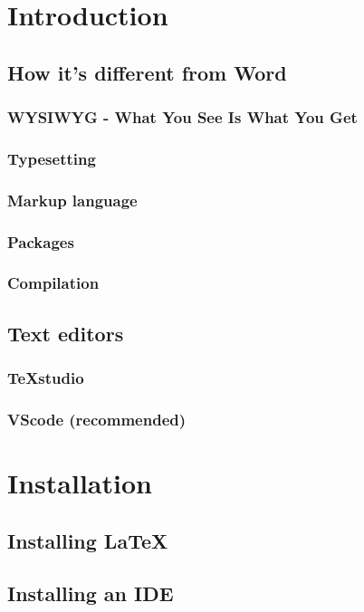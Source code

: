 \chapter{Introduction}
    \section{How it's different from Word}
            \subsection{WYSIWYG - What You See Is What You Get}
            \subsection{Typesetting}
            \subsection{Markup language}
            \subsection{Packages}
            \subsection{Compilation}
    \section{Text editors}
        \subsection{TeXstudio}
        \subsection{VScode (recommended)}

\chapter{Installation}
    \section{Installing \LaTeX}
    \section{Installing an IDE}

